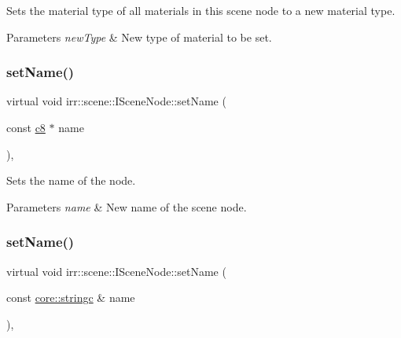 Sets the material type of all materials in this scene node to a new material type. 


\begin{DoxyParams}{Parameters}
{\em new\+Type} & New type of material to be set. \\
\hline
\end{DoxyParams}
\mbox{\label{classirr_1_1scene_1_1ISceneNode_a810a54a2fc178b9a0e731513865f67d0}} 
\subsubsection{\texorpdfstring{set\+Name()}{setName()}\hspace{0.1cm}{\footnotesize\ttfamily [1/2]}}
{\footnotesize\ttfamily virtual void irr\+::scene\+::\+I\+Scene\+Node\+::set\+Name (\begin{DoxyParamCaption}\item[{const \hyperlink{namespaceirr_a9395eaea339bcb546b319e9c96bf7410}{c8} $\ast$}]{name }\end{DoxyParamCaption})\hspace{0.3cm}{\ttfamily [inline]}, {\ttfamily [virtual]}}



Sets the name of the node. 


\begin{DoxyParams}{Parameters}
{\em name} & New name of the scene node. \\
\hline
\end{DoxyParams}
\mbox{\label{classirr_1_1scene_1_1ISceneNode_a20a22d956974f4817a20663361f20042}} 
\subsubsection{\texorpdfstring{set\+Name()}{setName()}\hspace{0.1cm}{\footnotesize\ttfamily [2/2]}}
{\footnotesize\ttfamily virtual void irr\+::scene\+::\+I\+Scene\+Node\+::set\+Name (\begin{DoxyParamCaption}\item[{const \hyperlink{namespaceirr_1_1core_ade1071a878633f2f6d8a75c5d11fec19}{core\+::stringc} \&}]{name }\end{DoxyParamCaption})\hspace{0.3cm}{\ttfamily [inline]}, {\ttfamily [virtual]}}



